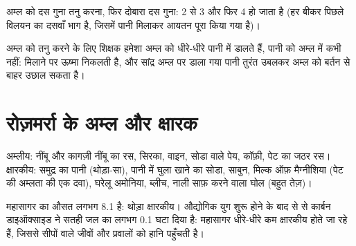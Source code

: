 \begin{omfigure}

{\small अम्ल को दस गुना तनु करना, फिर दोबारा दस गुना:  2 से 3 और फिर 4
हो जाता है (हर बीकर पिछले विलयन का दसवाँ भाग है, जिसमें पानी मिलाकर
आयतन पूरा किया गया है)।}
\end{omfigure}

\begin{inthelab}[अम्ल को तनु करना]
अम्ल को तनु करने के लिए शिक्षक हमेशा अम्ल को धीरे-धीरे पानी में डालते हैं,
पानी को अम्ल में कभी नहीं: मिलाने पर ऊष्मा निकलती है, और सांद्र अम्ल पर डाला
गया पानी तुरंत उबलकर अम्ल को बर्तन से बाहर
उछाल सकता है।
\end{inthelab}

\section{रोज़मर्रा के अम्ल और क्षारक}

\begin{proposition}[हमारे आस-पास के अम्ल और क्षारक]\label{prop:g9:acids-bases-ph:everyday}
अम्लीय: नींबू और कागज़ी नींबू का रस, सिरका, वाइन, सोडा वाले पेय, कॉफ़ी,
पेट का जठर रस। क्षारकीय: समुद्र का पानी (थोड़ा-सा), पानी में घुला खाने का
सोडा, साबुन, मिल्क ऑफ़ मैग्नीशिया (पेट की अम्लता की एक दवा), घरेलू अमोनिया,
ब्लीच, नाली साफ़ करने वाला घोल (बहुत तेज़)।
\end{proposition}

\begin{example}[महासागर का pH]\label{ex:g9:acids-bases-ph:ocean}
महासागर का औसत  लगभग 8.1 है: थोड़ा क्षारकीय। औद्योगिक युग शुरू होने के
बाद से  से  कार्बन डाइऑक्साइड ने सतही जल का  लगभग 0.1 घटा दिया
है: महासागर धीरे-धीरे कम क्षारकीय होते जा रहे हैं, जिससे सीपों वाले जीवों
और प्रवालों को हानि पहुँचती है।
\end{example}

